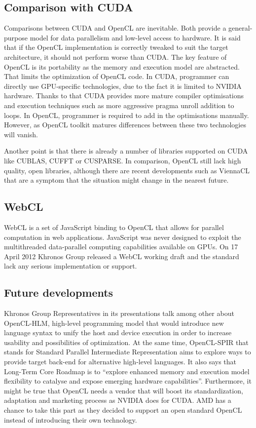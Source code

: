 \subsection{Comparison with CUDA}
Comparisons between CUDA and OpenCL are inevitable. Both provide a general-purpose model for data parallelism and low-level access to hardware. It is said that if the OpenCL implementation is correctly tweaked to suit the target architecture, it should not perform worse than CUDA. The key feature of OpenCL is its portability as the memory and execution model are abstracted. That limits the optimization of OpenCL code. In CUDA, programmer can directly use GPU-specific technologies, due to the fact it is limited to NVIDIA hardware. Thanks to that CUDA provides more mature compiler optimisations and execution techniques such as more aggressive pragma unroll addition to loops. In OpenCL, programmer is required to add in the optimisations manually. However, as OpenCL toolkit matures differences between these two technologies will vanish.

Another point is that there is already a number of libraries supported on CUDA like CUBLAS, CUFFT or CUSPARSE. In comparison, OpenCL still lack high quality, open libraries, although there are recent developments such as ViennaCL that are a symptom that the situation might change in the nearest future.



\subsection{WebCL}
WebCL is a set of JavaScript binding to OpenCL that allows for parallel computation in web applications. JavaScript was never designed to exploit the multithreaded data-parallel computing capabilities available on GPUs. On 17 April 2012 Khronos Group released a WebCL working draft and the standard lack any serious implementation or support.

\subsection{Future developments}
Khronos Group Representatives in its presentations talk among other about OpenCL-HLM, high-level programming model that would introduce new language syntax to unify the host and device execution in order to increase usability and possibilities of optimization. At the same time, OpenCL-SPIR that stands for Standard Parallel Intermediate Representation aims to explore ways to provide target back-end for alternative high-level languages. It also says that Long-Term Core Roadmap is to \enquote{explore enhanced memory and execution model flexibility to catalyse and expose emerging hardware capabilities}. Furthermore, it might be true that OpenCL needs a vendor that will boost its standardization, adaptation and marketing process as NVIDIA does for CUDA. AMD has a chance to take this part as they decided to support an open standard OpenCL instead of introducing their own technology.

